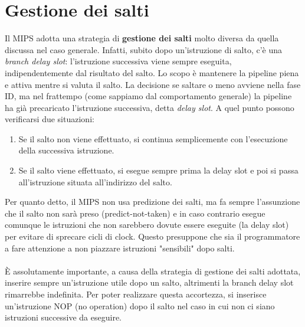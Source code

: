 \section{Gestione dei salti}
Il MIPS adotta una strategia di \textbf{gestione dei salti} molto diversa da quella discussa nel caso generale. Infatti, subito dopo un'istruzione di salto, c'è una \textit{branch delay slot}: l'istruzione successiva viene sempre eseguita, indipendentemente dal risultato del salto. Lo scopo è mantenere la pipeline piena e attiva mentre si valuta il salto. La decisione se saltare o meno avviene nella fase ID, ma nel frattempo (come sappiamo dal comportamento generale) la pipeline ha già precaricato l'istruzione successiva, detta \textit{delay slot}. A quel punto possono verificarsi due situazioni:
\begin{enumerate}
	\item Se il salto non viene effettuato, si continua semplicemente con l'esecuzione della successiva istruzione.
	\item Se il salto viene effettuato, si esegue sempre prima la delay slot e poi si passa all'istruzione situata all'indirizzo del salto.
\end{enumerate}
Per quanto detto, il MIPS non usa predizione dei salti, ma fa sempre l'assunzione che il salto non sarà preso (predict-not-taken) e in caso contrario esegue comunque le istruzioni che non sarebbero dovute essere eseguite (la delay slot) per evitare di sprecare cicli di clock. Questo presuppone che sia il programmatore a fare attenzione a non piazzare istruzioni "sensibili" dopo salti.
\\
\\
\MakeUppercase{è} assolutamente importante, a causa della strategia di gestione dei salti adottata, inserire sempre un'istruzione utile dopo un salto, altrimenti la branch delay slot rimarrebbe indefinita. Per poter realizzare questa accortezza, si inserisce un'istruzione NOP (no operation) dopo il salto nel caso in cui non ci siano istruzioni successive da eseguire.


